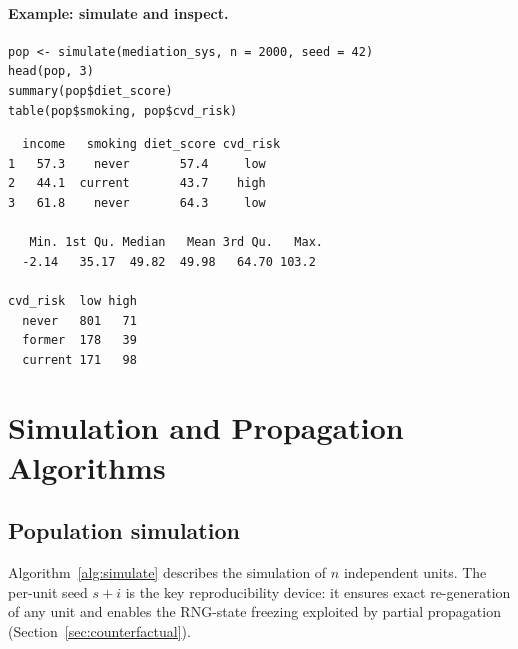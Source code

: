 \documentclass[12pt,a4paper]{article}
\begin{document}
\paragraph{Example: simulate and inspect.}

\begin{tcolorbox}[codebox, title={\small\textbf{R} code}]
\begin{verbatim}
pop <- simulate(mediation_sys, n = 2000, seed = 42)
head(pop, 3)
summary(pop$diet_score)
table(pop$smoking, pop$cvd_risk)
\end{verbatim}
\end{tcolorbox}

\begin{tcolorbox}[outputbox, title={\small Output}]
\begin{verbatim}
  income   smoking diet_score cvd_risk
1   57.3    never       57.4     low
2   44.1  current       43.7    high
3   61.8    never       64.3     low

   Min. 1st Qu. Median   Mean 3rd Qu.   Max.
  -2.14   35.17  49.82  49.98   64.70 103.2

cvd_risk  low high
  never   801   71
  former  178   39
  current 171   98
\end{verbatim}
\end{tcolorbox}

\section{Simulation and Propagation Algorithms}
\label{sec:simulation}

\subsection{Population simulation}
\label{sec:pop_alg}

Algorithm~\ref{alg:simulate} describes the simulation of $n$ independent units.
The per-unit seed $s + i$ is the key reproducibility device: it ensures exact
re-generation of any unit and enables the RNG-state freezing exploited by partial
propagation (Section~\ref{sec:counterfactual}).
\end{document}
